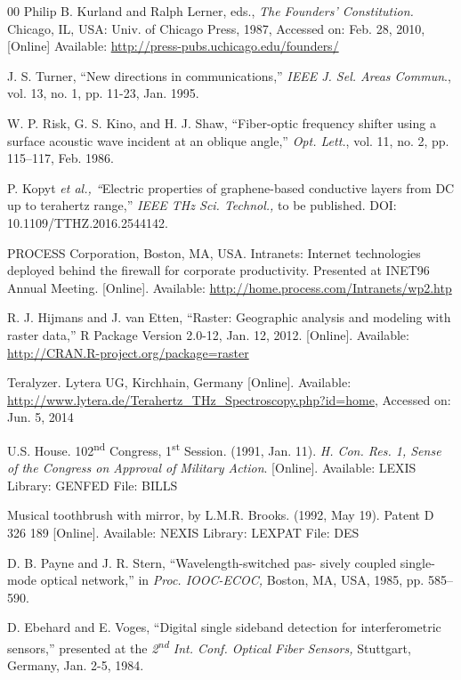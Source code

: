 \documentclass[journal,twoside,web]{ieeecolor}
\begin{document}
\begin{thebibliography}{00}
 Philip B. Kurland and Ralph Lerner, eds., \emph{The
Founders' Constitution.} Chicago, IL, USA: Univ. of Chicago Press,
1987, Accessed on: Feb. 28, 2010, [Online] Available:
\underline{http://press-pubs.uchicago.edu/founders/}

 J. S. Turner, ``New directions in communications,'' \emph{IEEE J. Sel. Areas Commun}., vol. 13, no. 1, pp. 11-23, Jan. 1995.

 W. P. Risk, G. S. Kino, and H. J. Shaw, ``Fiber-optic frequency shifter using a surface acoustic wave incident at an oblique angle,'' \emph{Opt. Lett.}, vol. 11, no. 2, pp. 115--117, Feb. 1986.

 P. Kopyt \emph{et al., ``}Electric properties of graphene-based conductive layers from DC up to terahertz range,'' \emph{IEEE THz Sci. Technol.,} to be published. DOI: 10.1109/TTHZ.2016.2544142.

 PROCESS Corporation, Boston, MA, USA. Intranets:
Internet technologies deployed behind the firewall for corporate
productivity. Presented at INET96 Annual Meeting. [Online].
Available: \underline{http://home.process.com/Intranets/wp2.htp}

 R. J. Hijmans and J. van Etten, ``Raster: Geographic analysis and modeling with raster data,'' R Package Version 2.0-12, Jan. 12, 2012. [Online]. Available: \underline {http://CRAN.R-project.org/package=raster} 

 Teralyzer. Lytera UG, Kirchhain, Germany [Online].
Available:
\underline{http://www.lytera.de/Terahertz\_THz\_Spectroscopy.php?id=home}, Accessed on: Jun. 5, 2014

 U.S. House. 102\textsuperscript{nd} Congress, 1\textsuperscript{st} Session. (1991, Jan. 11). \emph{H. Con. Res. 1, Sense of the Congress on Approval of}  \emph{Military Action}. [Online]. Available: LEXIS Library: GENFED File: BILLS

 Musical toothbrush with mirror, by L.M.R. Brooks. (1992, May 19). Patent D 326 189 [Online]. Available: NEXIS Library: LEXPAT File: DES

 D. B. Payne and J. R. Stern, ``Wavelength-switched pas- sively coupled single-mode optical network,'' in \emph{Proc. IOOC-ECOC,} Boston, MA, USA, 1985, pp. 585--590.

 D. Ebehard and E. Voges, ``Digital single sideband detection for interferometric sensors,'' presented at the \emph{2\textsuperscript{nd} Int. Conf. Optical Fiber Sensors,} Stuttgart, Germany, Jan. 2-5, 1984.


\end{thebibliography}
\end{document}
